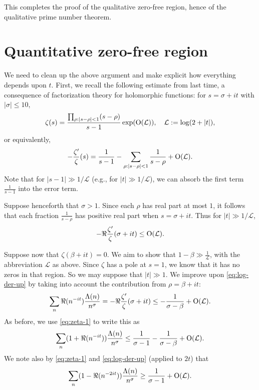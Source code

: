 \documentclass[reqno]{amsart} 
\begin{document}
This completes the proof of the qualitative zero-free region, hence of the qualitative prime number theorem.
\section{Quantitative zero-free region}
\label{sec:org45a909a}
We need to clean up the above argument and make explicit how everything depends upon $t$.  First, we recall the following estimate from last time, a consequence of factorization theory for holomorphic functions: for $s = \sigma + i t$ with $|\sigma| \leq 10$,
\begin{equation}
  \zeta(s)
  =
  \frac{\prod_{\rho : |s - \rho| < 1} (s - \rho)}{s - 1}
  \exp(\operatorname{O}(\mathcal{L})),
  \quad
  \mathcal{L} := \log(2 + |t|),
\end{equation}
or equivalently,
\begin{equation}
  - \frac{\zeta ' }{\zeta }(s)
  =
  \frac{1}{s - 1}
  -\sum_{\rho : |s - \rho| < 1}
  \frac{1}{s - \rho}
  + \operatorname{O}(\mathcal{L}).
\end{equation}
Note that for $|s-1| \gg 1/\mathcal{L}$ (e.g., for $|t| \gg 1/\mathcal{L}$), we can absorb the first term $\frac{1}{s - 1}$ into the error term.

Suppose henceforth that $\sigma > 1$.  Since each $\rho$ has real part at most $1$, it follows that each fraction $\frac{1}{s - \rho }$ has positive real part when $s = \sigma + i t$.  Thus for $|t| \gg 1/\mathcal{L}$,
\begin{equation}\label{eq:log-der-up}
  - \Re \frac{\zeta ' }{\zeta }(\sigma + i t)
  \leq 
  \operatorname{O}(\mathcal{L}).
\end{equation}

Suppose now that $\zeta(\beta + i t) = 0$.  We aim to show that $1 - \beta \gg \frac{1}{ \mathcal{L} }$, with the abbreviation $\mathcal{L}$ as above.  Since $\zeta$ has a pole at $s = 1$, we know that it has no zeros in that region.  So we may suppose that $|t| \gg 1$.  We improve upon \eqref{eq:log-der-up} by taking into account the contribution from $\rho = \beta + i t$:
\begin{equation}\label{eq:log-der-up}
  \sum_n
  \Re(n^{-it})
  \frac{\Lambda(n)}{n^\sigma }
  =
  - \Re \frac{\zeta ' }{\zeta }(\sigma + i t)
  \leq
  -\frac{1}{\sigma - \beta }
  +
  \operatorname{O}(\mathcal{L}).
\end{equation}
As before, we use \eqref{eq:zeta-1} to write this as
\begin{equation}\label{eq:log-der-up-2}
  \sum_n
  (1 + \Re(n^{-it}))
  \frac{\Lambda(n)}{n^\sigma }
  \leq
  \frac{1}{\sigma - 1}
  -
  \frac{1}{\sigma - \beta }
  +
  \operatorname{O}(\mathcal{L}).
\end{equation}
We note also by \eqref{eq:zeta-1} and \eqref{eq:log-der-up} (applied to $2 t$) that
\begin{equation}\label{eq:quant-est-n-2-it}
  \sum_n
  (1 - \Re(n^{-2 it}))
  \frac{\Lambda(n)}{n^\sigma }
  \geq
  \frac{1}{\sigma - 1}
  + 
  \operatorname{O}(\mathcal{L}).
\end{equation}
\end{document}
